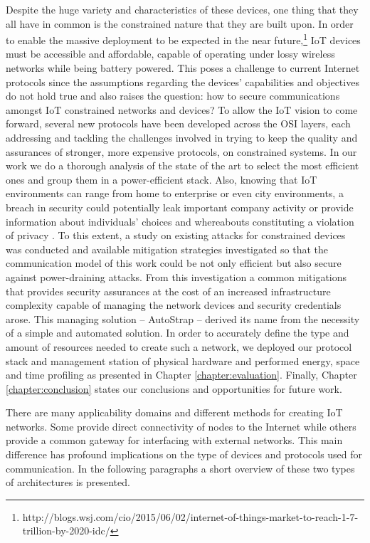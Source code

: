 Despite the huge variety and characteristics of these devices, one thing that they all have in common is the constrained nature that they are built upon. In order to enable the massive deployment to be expected in the near future,\footnote{http://blogs.wsj.com/cio/2015/06/02/internet-of-things-market-to-reach-1-7-trillion-by-2020-idc/} \gls{IoT} devices must be accessible and affordable, capable of operating under lossy wireless networks while being battery powered. This poses a challenge to current Internet protocols since the assumptions regarding the devices' capabilities and objectives do not hold true \cite{Trappe2015} and also raises the question: how to secure communications amongst \gls{IoT} constrained networks and devices? To allow the \gls{IoT} vision to come forward, several new protocols have been developed across the OSI layers, each addressing and tackling the challenges involved in trying to keep the quality and assurances of stronger, more expensive protocols, on constrained systems. In our work we do a thorough analysis of the state of the art to select the most efficient ones and group them in a power-efficient stack. Also, knowing that \gls{IoT} environments can range from home to enterprise or even city environments, a breach in security could potentially leak important company activity or provide information about individuals' choices and whereabouts constituting a violation of privacy \cite{Ukil2015}. To this extent, a study on existing attacks for constrained devices was conducted and available mitigation strategies investigated so that the communication model of this work could be not only efficient but also secure against power-draining attacks. From this investigation a common mitigations that provides security assurances at the cost of an increased infrastructure complexity capable of managing the network devices and security credentials arose. This managing solution -- AutoStrap -- derived its name from the necessity of a simple and automated solution. In order to accurately define the type and amount of resources needed to create such a network, we deployed our protocol stack and management station of physical hardware and performed energy, space and time profiling as presented in Chapter \ref{chapter:evaluation}. Finally, Chapter \ref{chapter:conclusion} states our conclusions and opportunities for future work.
	
	
There are many applicability domains and different methods for creating \gls{IoT} networks.
Some provide direct connectivity of nodes to the Internet while others provide a common gateway for interfacing with external networks. This main difference has profound implications on the type of devices and protocols used for communication. In the following paragraphs a short overview of these two types of architectures is presented.




